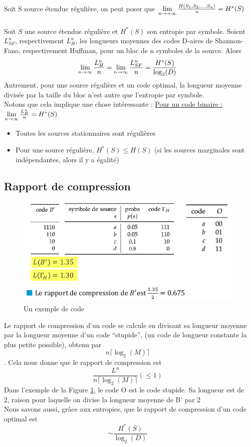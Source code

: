 \documentclass[11pt,a4paper]{article}
\begin{document}
\\
 Soit S source étendue régulière, on peut poser que $\lim\limits_{n\to +\infty}\frac{H(S_1,S_2,...,S_n)}{n} = H^*(S)$\\
\\
 Soit $S$ une source étendue régulière et $H^*(S)$ son entropie par symbole. Soient $L^n_{SF}$, respectivement $L^n_{H}$, les longueurs moyennes des codes D-aires de Shannon-Fano, respectivement Huffman, pour un bloc de n symboles de la source. Alors
\begin{equation*}
	\lim\limits_{n \to \infty} \frac{L_H^n}{n} = \lim\limits_{n \to \infty} \frac{L_{SF}^n}{n} = \frac{H^*(S)}{\log_2(D)}
\end{equation*}
Autrement, pour une source régulière et un code optimal, la longueur moyenne divisée par la taille du bloc n'est autre que l'entropie par symbole.\\
Notons que cela implique une chose intéressante : \uline{Pour un code binaire :} $\lim\limits_{n \to \infty} \frac{L_H^n}{n} = H^*(S)$\\
\begin{itemize}
	\item Toutes les sources stationnaires sont régulières
	\item {} Pour une source régulière, $H^*(S) \leq H(S)$ (si les sources marginales sont indépendantes, alors il y a égalité)
\end{itemize}

\subsection{Rapport de compression}
\begin{figure}
	\includegraphics[scale=0.5]{images/compression}
	\caption{Un exemple de code}
	\label{compression}
\end{figure}
Le rapport de compression d'un code se calcule en divisant sa longueur moyenne par la longueur moyenne d'un code \enquote{stupide}, (un code de longueur constante la plus petite possible), obtenu par \[n\lceil \log_2(M)\rceil\]. Cela nous donne que le rapport de compression est \[\frac{L^n}{n\lceil \log_2(M)\rceil} (\leq 1)\]
Dans l'exemple de la Figure \ref{compression}, le code O est le code stupide. Sa longueur est de 2, raison pour laquelle on divise la longueur moyenne de B' par 2\\
Nous savons aussi, grâce aux entropies, que le rapport de compression d'un code optimal est \[ \sim\frac{H^*(S)}{\log_2(D)}\]
\end{document}
